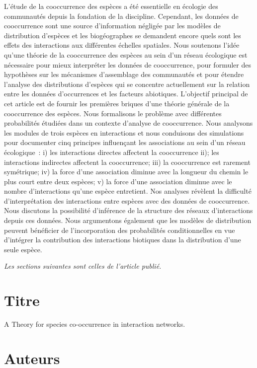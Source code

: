 L'étude de la cooccurrence des espèces a été essentielle en écologie des
communautés depuis la fondation de la discipline. Cependant,
les données de cooccurrence sont une source d'information négligée par
les modèles de distribution d'espèces et les biogéographes se demandent encore
quels sont les effets des interactions aux différentes échelles spatiales.
Nous soutenons l'idée qu'une théorie de la cooccurrence
des espèces au sein d'un réseau écologique est nécessaire pour mieux
interpréter les données de cooccurrence, pour formuler des hypothèses sur
les mécanismes d'assemblage des communautés et pour étendre l'analyse des
distributions d'espèces qui se concentre actuellement sur la relation entre les
données d'occurrences et les facteurs abiotiques. L'objectif principal de cet
article est de fournir les premières briques d'une théorie générale de la
cooccurrence des espèces. Nous formalisons le problème avec différentes
probabilités étudiées dans un contexte d'analyse de cooccurrence.
Nous analysons les modules de trois espèces en interactions et nous conduisons
des simulations pour documenter cinq principes influençant les associations au
sein d'un réseau écologique~: i) les interactions directes affectent la
cooccurrence ii); les interactions indirectes affectent la cooccurrence;
iii) la cooccurrence est rarement symétrique; iv) la force d'une association
diminue avec la longueur du chemin le plus court entre deux espèces;
v) la force d'une association diminue avec le nombre d'interactions
qu'une espèce entretient. Nos analyses révèlent la difficulté d'interprétation
des interactions entre espèces avec des données de cooccurrence.
Nous discutons la possibilité d'inférence de la structure des réseaux
d'interactions depuis ces données. Nous argumentons également que les modèles
de distribution peuvent bénéficier de l'incorporation des probabilités
conditionnelles en vue d'intégrer la contribution des interactions biotiques
dans la distribution d'une seule espèce.


\emph{Les sections suivantes sont celles de l'article publié.}





\section{Titre}

A Theory for species co-occurrence in interaction networks.

\section{Auteurs}

